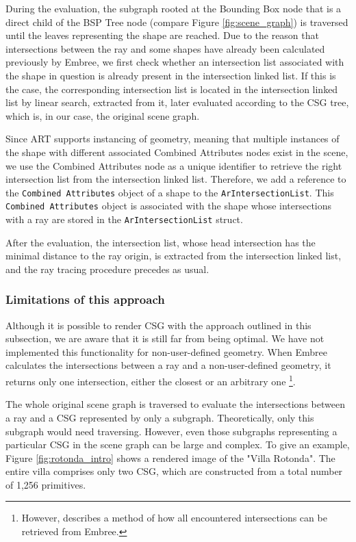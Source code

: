 During the evaluation, the subgraph rooted at the Bounding Box node that is a direct child of the BSP Tree node (compare Figure \ref{fig:scene_graph}) is traversed until the leaves representing the shape are reached. Due to the reason that intersections between the ray and some shapes have already been calculated previously by Embree, we first check whether an intersection list associated with the shape in question is already present in the intersection linked list. If this is the case, the corresponding intersection list is located in the intersection linked list by linear search, extracted from it, later evaluated according to the CSG tree, which is, in our case, the original scene graph.

Since ART supports instancing of geometry, meaning that multiple instances of the shape with different associated Combined Attributes nodes exist in the scene, we use the Combined Attributes node as a unique identifier to retrieve the right intersection list from the intersection linked list.
Therefore, we add a reference to the \texttt{Combined Attributes} object of a shape to the \texttt{ArIntersectionList}. This \texttt{Combined Attributes} object is associated with the shape whose intersections with a ray are stored in the \texttt{ArIntersectionList} struct.


After the evaluation, the intersection list, whose head intersection has the minimal distance to the ray origin, is extracted from the intersection linked list, and the ray tracing procedure precedes as usual.

\subsubsection{Limitations of this approach}

Although it is possible to render CSG with the approach outlined in this subsection, we are aware that it is still far from being optimal. We have not implemented this functionality for non-user-defined geometry. When Embree calculates the intersections between a ray and a non-user-defined geometry, it returns only one intersection, either the closest or an arbitrary one \footnote{However, \cite{karaffova2016} describes a method of how all encountered intersections can be retrieved from Embree.}.

The whole original scene graph is traversed to evaluate the intersections between a ray and a CSG represented by only a subgraph. Theoretically, only this subgraph would need traversing. However, even those subgraphs representing a particular CSG in the scene graph can be large and complex. To give an example, Figure \ref{fig:rotonda_intro} shows a rendered image of the "Villa Rotonda". The entire villa comprises only two CSG, which are constructed from a total number of 1,256 primitives.

